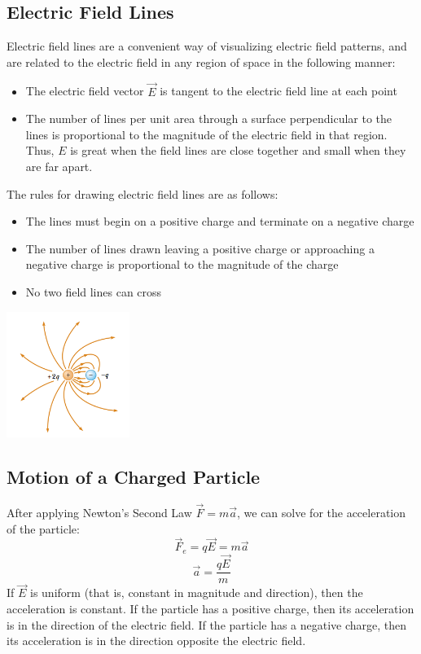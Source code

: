 \documentclass{article}
\begin{document}
	\subsection{Electric Field Lines}
    	Electric field lines are a convenient way of visualizing electric field patterns, and are related to the electric field in any region of space in the following manner:\\
        \begin{itemize}
        	\item The electric field vector $\vec{E}$ is tangent to the electric field line at each point
            \item The number of lines per unit area through a surface perpendicular to the lines is proportional to the magnitude of the electric field in that region. Thus, $E$ is great when the field lines are close together and small when they are far apart.\\
        \end{itemize}
        \begin{multicols}{2}
        	The rules for drawing electric field lines are as follows:\\
        	\begin{itemize}
        		\item The lines must begin on a positive charge and terminate on a negative charge
            	\item The number of lines drawn leaving a positive charge or approaching a negative charge is proportional to the magnitude of the charge
            	\item No two field lines can cross
        	\end{itemize}
            \vfill
            \columnbreak
            \centerline{\includegraphics[width=4cm]{fieldLines.png}}
        \end{multicols}
        
	\subsection{Motion of a Charged Particle}
    	After applying Newton's Second Law $\vec{F}=m\vec{a}$, we can solve for the acceleration of the particle:
        \[
        	\vec{F}_e=q\vec{E}=m\vec{a}
        \]
        \[
        	\vec{a}=\frac{q\vec{E}}{m}
        \]
        If $\vec{E}$ is uniform (that is, constant in magnitude and direction), then the acceleration is constant. If the particle has a positive charge, then its acceleration is in the direction of the electric field. If the particle has a negative charge, then its acceleration is in the direction opposite the electric field.
        
\end{document}
